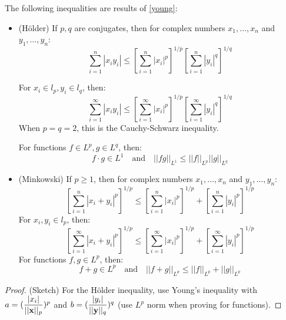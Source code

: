 \begin{cor}
    The following inequalities are results of \autoref{young}:  
    \begin{itemize}
        \item (Hölder) If $p,q$ are conjugates, then for complex numbers $x_1, \dots, x_n$ and $y_1,\dots, y_n$:    
                        \begin{equation}
                            \sum_{i=1}^n |x_i y_i| \leq \left[\sum_{i=1}^n |x_i|^p\right]^{1/p} \left[\sum_{i=1}^n |y_i|^q\right]^{1/q}
                        \end{equation}  

                    For ${x_i} \in l_p, {y_i} \in l_q$, then:  
                    \begin{equation}
                        \sum_{i=1}^{\infty} |x_i y_i| \leq \left[\sum_{i=1}^{\infty} |x_i|^p\right]^{1/p} \left[\sum_{i=1}^{\infty} |y_i|^q\right]^{1/q}
                    \end{equation}  
                    When $p=q=2$, this is the Cauchy-Schwarz inequality.  

                    For functions $f \in L^p, g \in L^q$, then:  
                        \begin{equation}
                            f \cdot g \in L^1 \quad \text{and} \quad ||fg||_{L^1} \leq ||f||_{L^p} ||g||_{L^q}
                        \end{equation}
        \item (Minkowski) If $p \geq 1$, then for complex numbers  $x_1, \dots, x_n$ and $y_1,\dots, y_n$:
                        \begin{equation}
                            \left[\sum_{i=1}^n |x_i+y_i|^p \right]^{1/p} \leq \left[\sum_{i=1}^n |x_i|^p\right]^{1/p} + \left[\sum_{i=1}^n |y_i|^p\right]^{1/p}
                        \end{equation}
                    For ${x_i}, {y_i} \in l_p$, then:
                    \begin{equation}
                        \left[\sum_{i=1}^{\infty} |x_i+y_i|^p \right]^{1/p} \leq \left[\sum_{i=1}^{\infty} |x_i|^p\right]^{1/p} + \left[\sum_{i=1}^{\infty} |y_i|^p\right]^{1/p}
                    \end{equation}
                    For functions $f, g \in L^p$, then:
                        \begin{equation}
                            f+g \in L^p \quad \text{and} \quad ||f+g||_{L^p} \leq ||f||_{L^p} + ||g||_{L^p}
                        \end{equation}
    \end{itemize}
    \begin{proof}
        (Sketch) For the Hölder inequality, use Young's inequality with $a=(\dfrac{|x_i|}{||\mathbf{x}||_p})^p$ and 
        $b=(\dfrac{|y_i|}{||\mathbf{y}||_q})^q$ (use $L^p$ norm when proving for functions).  
        

\end{proof}
\end{cor}
